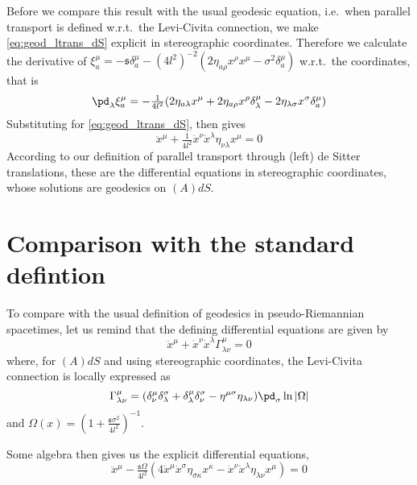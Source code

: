 \documentclass[10pt]{article}
\numberwithin{equation}{section}
\begin{document}
Before we compare this result with the usual geodesic equation, 
i.e.\ when parallel transport is defined w.r.t.\ the Levi-Civita 
connection, we make \eqref{eq:geod_ltrans_dS} explicit in 
stereographic coordinates. Therefore we calculate the derivative 
of $\xi^\mu_a = -\mathfrak{s} \delta^\mu_a - (4 l^2)^{-2} 
(2\eta_{a\rho} x^\rho x^\mu - \sigma^2 \delta^\mu_a)$ w.r.t.\ the 
coordinates, that is
%
\begin{displaymath}
	\pd_\lambda \xi^\mu_a = -\tfrac{1}{4l^2} (2\eta_{a\lambda}x^\mu 
	+ 2\eta_{a\rho}x^\rho\delta^\mu_\lambda - 
	2\eta_{\lambda\sigma}x^\sigma\delta^\mu_a)
\end{displaymath}
%
Substituting for \eqref{eq:geod_ltrans_dS}, then gives
%
\begin{equation}
	\ddot{x}^\mu + \tfrac{1}{4l^2} \dot{x}^\nu \dot{x}^\lambda 
	\eta_{\nu\lambda} x^\mu = 0
\end{equation}
According to our definition of parallel transport through (left) 
de Sitter translations, these are the differential equations in 
stereographic coordinates, whose solutions are geodesics on 
$(A)dS$.

\section{Comparison with the standard defintion}

To compare with the usual definition of geodesics in 
pseudo-Riemannian spacetimes, let us remind that the defining 
differential equations are given by
%
\begin{equation}
	\ddot{x}^\mu + \dot{x}^\nu \dot{x}^\lambda 
	\Gamma^\mu_{\lambda\nu} = 0
\end{equation}
where, for $(A)dS$ and using stereographic coordinates, the 
Levi-Civita connection is locally expressed as
%
\begin{displaymath}
	\Gamma^\mu_{\lambda\nu} = (\delta^\mu_\nu \delta^\sigma_\lambda
	+ \delta^\mu_\lambda \delta^\sigma_\nu - \eta^{\mu\sigma} 
	\eta_{\lambda\nu}) \pd_\sigma \ln |\Omega|
\end{displaymath}
and $\Omega(x) = (1+\tfrac{\mathfrak{s}\sigma^2}{4l^2})^{-1}$.

Some algebra then gives us the explicit differential equations,
%
\begin{equation}
	\ddot{x}^\mu - \tfrac{\mathfrak{s}\Omega}{4l^2} (4\dot{x}^\mu 
	\dot{x}^\sigma \eta_{\sigma\kappa} x^\kappa - \dot{x}^\nu 
	\dot{x}^\lambda \eta_{\lambda\nu} x^\mu) = 0
\end{equation}
\end{document}
